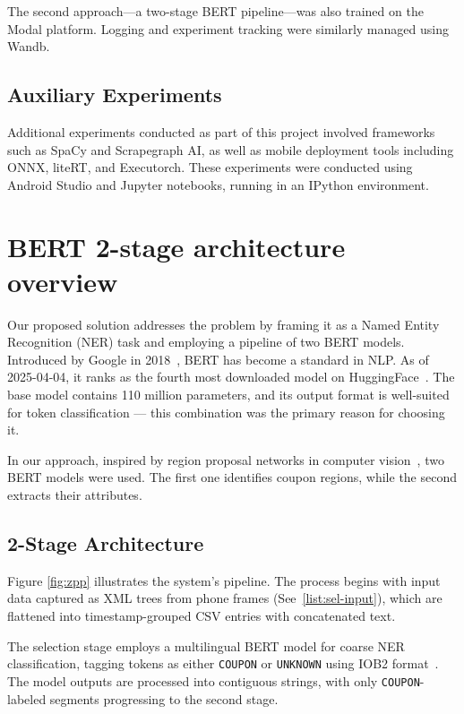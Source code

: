 \documentclass[licencjacka,en]{pracamgr}
\begin{document}
The second approach—a two-stage BERT pipeline—was also trained on the Modal platform. Logging and experiment tracking were similarly managed using Wandb.

\section{Auxiliary Experiments}

Additional experiments conducted as part of this project involved frameworks such as SpaCy\cite{spacy, spacy-exp} and Scrapegraph AI, as well as mobile deployment tools including ONNX\cite{onnx, onnx-exp}, liteRT\cite{lite-rt, lite-rt-exp}, and Executorch\cite{executorch, executorch-exp}. These experiments were conducted using Android Studio\cite{android-studio, service_demo_app_repo} and Jupyter notebooks\cite{jupyter}, running in an IPython\cite{ipython} environment.


\chapter{BERT 2-stage architecture overview} \label{chap:bert}
Our proposed solution addresses the problem by framing it as a Named Entity Recognition (NER) task and employing a pipeline of two BERT models. Introduced by Google in 2018~\cite{BERT_intro}, BERT has become a standard in NLP. As of 2025-04-04, it ranks as the fourth most downloaded model on HuggingFace~\cite{BERT_hf}. The base model contains 110 million parameters, and its output format is well-suited for token classification — this combination was the primary reason for choosing it.

In our approach, inspired by region proposal networks in computer vision~\cite{Region_proposal}, two BERT models were used. The first one identifies coupon regions, while the second extracts their attributes.

\section{2-Stage Architecture}
Figure \ref{fig:zpp} illustrates the system's pipeline. The process begins with input data captured as XML trees from phone frames (See~\ref{list:sel-input}), which are flattened into timestamp-grouped CSV entries with concatenated text. 

The selection stage employs a multilingual BERT model for coarse NER classification, tagging tokens as either \texttt{COUPON} or \texttt{UNKNOWN} using IOB2 format~\cite{iob2}. The model outputs are processed into contiguous strings, with only \texttt{COUPON}-labeled segments progressing to the second stage.
\end{document}
